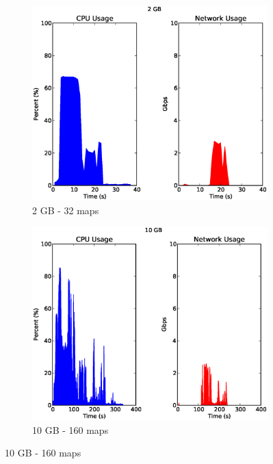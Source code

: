 \documentclass[a4paper,12pt,twoside,openright]{report}
\begin{document}
\begin{figure}[h!]
        \begin{subfigure}[b]{0.33\textwidth}
                \centering
                \includegraphics[width=\textwidth]{32maps.csv.eps}
                \caption{2 GB - 32 maps}
                \label{fig:2GBsortres}
        \end{subfigure}%
        \begin{subfigure}[b]{0.33\textwidth}
                \centering
                \includegraphics[width=\textwidth]{160maps.csv.eps}
                \caption{10 GB - 160 maps}

\end{subfigure}
\end{figure}
\end{document}
